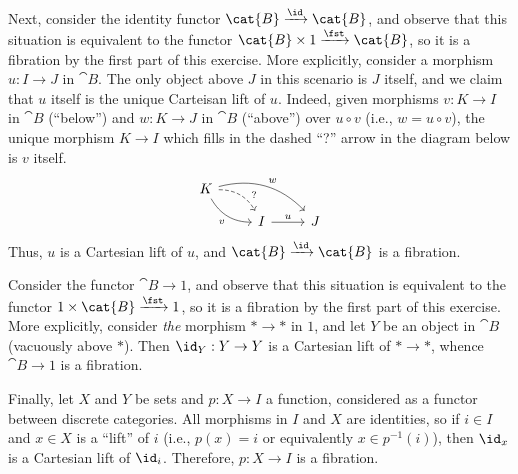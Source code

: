 \begin{solution}
Next, consider the identity functor \(\cat{B} \xrightarrow{\id} \cat{B}\), and observe that this situation is equivalent to the functor \(\cat{B} \times 1 \xrightarrow{\fst} \cat{B}\), so it is a fibration by the first part of this exercise.
More explicitly, consider a morphism \(u : I \to J\) in \(\cat{B}\).
The only object above \(J\) in this scenario is \(J\) itself, and we claim that \(u\) itself is the unique Carteisan lift of \(u\).
Indeed, given morphisms \(v : K \to I\) in \(\cat{B}\) (``below'') and \(w : K \to J\) in \(\cat{B}\) (``above'') over \(u \circ v\) (i.e., \(w = u \circ v\)), the unique morphism \(K \to I\) which fills in the dashed ``?'' arrow in the diagram below is \(v\) itself.
\begin{equation*}
\begin{tikzcd}[row sep=small]
K \arrow[rd, bend left, dashed, near end, "?"] \arrow[rd, bend right, "v"{below left}] \arrow[rrd, bend left, "w"] \\
& I \arrow[r, "u"] & J
\end{tikzcd}
\end{equation*}
Thus, \(u\) is a Cartesian lift of \(u\), and \(\cat{B} \xrightarrow{\id} \cat{B}\) is a fibration.

Consider the functor \(\cat{B} \to 1\), and observe that this situation is equivalent to the functor \(1 \times \cat{B} \xrightarrow{\fst} 1\), so it is a fibration by the first part of this exercise.
More explicitly, consider \emph{the} morphism \(* \to *\) in \(1\), and let \(Y\) be an object in \(\cat{B}\) (vacuously above \(*\)).
Then \(\id_Y : Y \to Y\) is a Cartesian lift of \(* \to *\), whence \(\cat{B} \to 1\) is a fibration.

Finally, let \(X\) and \(Y\) be sets and \(p : X \to I\) a function, considered as a functor between discrete categories.
All morphisms in \(I\) and \(X\) are identities, so if \(i \in I\) and \(x \in X\) is a ``lift'' of \(i\) (i.e., \(p(x) = i\) or equivalently \(x \in p^{-1}(i)\)), then \(\id_x\) is a Cartesian lift of \(\id_i\).
Therefore, \(p : X \to I\) is a fibration.
\end{solution}